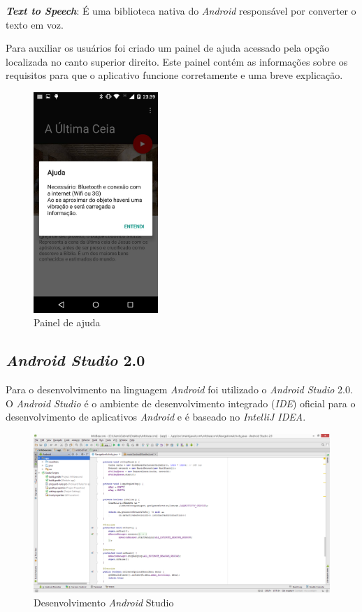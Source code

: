 \textbf{\textit{Text to Speech}}: É uma biblioteca nativa do \textit{Android} responsável por converter o texto em voz.

Para auxiliar os usuários foi criado um painel de ajuda acessado pela opção localizada no canto superior direito.
Este painel contém as informações sobre os requisitos para que o aplicativo funcione corretamente e uma breve explicação.

\begin{figure}[H]
  \centering
  \includegraphics[width=4.7cm]{./figs/app5.png}
  \caption{Painel de ajuda}
  \par{}
\end{figure}

\subsection{\textit{Android Studio} 2.0}
Para o desenvolvimento na linguagem \textit{Android} foi utilizado o \textit{Android Studio} 2.0.
O \textit{Android Studio} é o ambiente de desenvolvimento integrado (\textit{IDE}) oficial para o desenvolvimento de aplicativos \textit{Android} e é baseado no \textit{IntelliJ IDEA}. \cite{androidstudio}

\begin{figure}[H]
  \centering
  \includegraphics[width=14cm]{./figs/Android_Studio.png}
  \caption{Desenvolvimento \textit{Android} Studio}
  \par{}
\end{figure}

